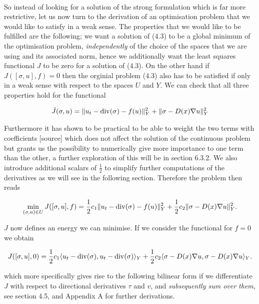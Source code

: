 \documentclass[../draft_1.tex]{subfiles}
\begin{document}
\smallskip
\\
So instead of looking for a solution of the strong formulation which is far more restrictive, let us now turn to the derivation of an optimisation problem that we would like to satisfy in a weak sense. The properties that we would like to be fulfilled are the following; we want a solution of (4.3) to be a global minimum of the optimisation problem, \textit{independently} of the choice of the spaces that we are using and its associated norm, hence we additionally want the least squares functional $J$ to be zero for a solution of (4.3). On the other hand if $J([\sigma, u], f) = 0$ then the orginial problem (4.3) also has to be satisfied if only in a weak sense with respect to the spaces $U$ and $Y$. We can check that all three properties hold for the functional  
\begin{ceqn}
\begin{align}
\tilde{J}(\sigma, u) =\| u_t - \mathop{}\!\mathrm{div}(\sigma) - f(u) \|_Y^2 + \| \sigma - D(x) \nabla u \| _Y^2
\end{align}
\end{ceqn}
Furthermore it has shown to be practical to be able to weight the two terms with coefficients [source] which does not affect the solution of the continuous problem but grants us the possibility to numerically give more importance to one term than the other, a further exploration of this will be in section 6.3.2. We also introduce additional scalars of $\frac{1}{2}$ to simplify further computations of the derivatives as we will see in the following section. Therefore the problem then reads
\begin{ceqn}
	\begin{align}
	\label{functional}
  \min_{(\sigma, u) \in U} J([\sigma, u], f) = \frac{1}{2} c_1 \| u_t - \mathop{}\!\mathrm{div}(\sigma) - f(u) \|_Y^2 + \frac{1}{2} c_2 \| \sigma - D(x) \nabla u \|_Y^2.
	\end{align}
\end{ceqn}
$J$ now defines an energy we can minimise. If we consider the functional for $ f = 0$ we obtain
\begin{ceqn}
	\begin{align}
J([\sigma, u], 0) = \frac{1}{2} c_1 \langle u_t - \mathop{}\!\mathrm{div}(\sigma), u_t - \mathop{}\!\mathrm{div}(\sigma)\rangle_Y + \frac{1}{2} c_2 \langle \sigma - D(x) \nabla u, \sigma - D(x) \nabla u \rangle_Y.
	\end{align}
\end{ceqn}
which more specifically gives rise to the following bilinear form if we differentiate $J$ with respect to directional derivatives $\tau$ and $v$, and \textit{subsequently sum over them}, see section 4.5, and Appendix A for further derivations. 
\end{document}
